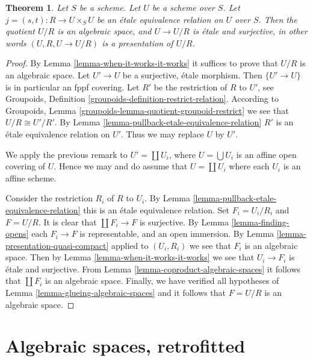 \documentclass{stacks-project}
\theoremstyle{plain}
\newtheorem{theorem}[subsection]{Theorem}
\theoremstyle{definition}
\theoremstyle{remark}
\numberwithin{equation}{subsection}
\begin{document}
\begin{theorem}
\label{theorem-presentation}
Let $S$ be a scheme. Let $U$ be a scheme over $S$.
Let $j = (s, t) : R \to U \times_S U$
be an \'etale equivalence relation on $U$ over $S$.
Then the quotient $U/R$ is an algebraic space,
and $U \to U/R$ is \'etale and surjective, in other words
$(U, R, U \to U/R)$ is a presentation of $U/R$.
\end{theorem}

\begin{proof}
By Lemma \ref{lemma-when-it-works-it-works}
it suffices to prove that $U/R$ is an algebraic space.
Let $U' \to U$ be a surjective, \'etale morphism.
Then $\{U' \to U\}$ is in particular an fppf covering.
Let $R'$ be the restriction of $R$ to $U'$, see
Groupoids, Definition \ref{groupoids-definition-restrict-relation}.
According to
Groupoids, Lemma \ref{groupoids-lemma-quotient-groupoid-restrict}
we see that $U/R \cong U'/R'$.
By Lemma \ref{lemma-pullback-etale-equivalence-relation} $R'$ is an
\'etale equivalence relation on $U'$. Thus we may replace $U$ by $U'$.

\medskip\noindent
We apply the previous remark to $U' = \coprod U_i$, where
$U = \bigcup U_i$ is an affine open covering of $U$. Hence we
may and do assume that $U = \coprod U_i$ where
each $U_i$ is an affine scheme.

\medskip\noindent
Consider the restriction $R_i$ of $R$ to $U_i$.
By Lemma \ref{lemma-pullback-etale-equivalence-relation}
this is an \'etale equivalence relation.
Set $F_i = U_i/R_i$ and $F = U/R$.
It is clear that $\coprod F_i \to F$ is surjective.
By Lemma \ref{lemma-finding-opens} each $F_i \to F$
is representable, and an open immersion.
By Lemma \ref{lemma-presentation-quasi-compact}
applied to $(U_i, R_i)$ we see that $F_i$ is an algebraic space.
Then by Lemma \ref{lemma-when-it-works-it-works} we see that
$U_i \to F_i$ is \'etale and surjective.
From Lemma \ref{lemma-coproduct-algebraic-spaces}
it follows that $\coprod F_i$ is an algebraic space.
Finally, we have verified all
hypotheses of Lemma \ref{lemma-glueing-algebraic-spaces}
and it follows that $F = U/R$ is an algebraic space.
\end{proof}










\section{Algebraic spaces, retrofitted}
\label{section-algebraic-spaces-retrofitted}
\end{document}
